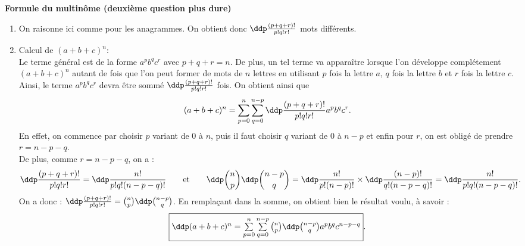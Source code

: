 \documentclass[a4paper, 11pt]{article}
\begin{document}
\begin{correction}  \; \textbf{Formule du multin\^ome (deuxi\`eme question plus dure)}
	\begin{enumerate}
		\item On raisonne ici comme pour les anagrammes. On obtient donc $\ddp\frac{(p+q+r)!}{p!q!r!}$ mots diff\'erents.
		\item Calcul de $(a+b+c)^n$:\\
		      \noindent Le terme g\'en\'eral est de la forme $a^{p} b^{q} c^{r}$ avec $p+q+r=n$. De plus, un tel terme va appara\^itre lorsque l'on d\'eveloppe compl\'etement $(a+b+c)^n$ autant de fois que l'on peut former de mots de $n$ lettres en utilisant $p$ fois la lettre $a$, $q$ fois la lettre $b$ et $r$ fois la lettre $c$. Ainsi, le terme $a^{p} b^{q} c^{r}$ devra \^etre somm\'e $\ddp\frac{(p+q+r)!}{p!q!r!}$ fois. On obtient ainsi que
		      $$(a+b+c)^n =\sum\limits_{p=0}^n \sum\limits_{q=0}^{n-p} \ddp\frac{(p+q+r)!}{p!q!r!} a^p b^q c^r.$$
		      En effet, on commence par choisir $p$ variant de $0$ \`a $n$, puis il faut choisir $q$ variant de $0$ \`a $n-p$ et enfin pour $r$, on est oblig\'e de prendre $r=n-p-q$.\\
		      De plus, comme $r=n-p-q$, on a :
		      $$\ddp\frac{(p+q+r)!}{p!q!r!}= \ddp\frac{n!}{p!q!(n-p-q)!}\qquad \hbox{et}\qquad \ddp \binom{n}{p}\ddp \binom{n-p}{q}=\ddp\frac{n!}{p!(n-p)!}\times\ddp\frac{(n-p)!}{q!(n-p-q)!} = \ddp\frac{n!}{p!q!(n-p-q)!}.$$
		      On a donc : $\ddp\frac{(p+q+r)!}{p!q!r!}= \binom{n}{p}\ddp \binom{n-p}{q}$. En rempla\c cant dans la somme, on obtient bien le r\'esultat voulu, \`a savoir :
		      $$\fbox{$\ddp  (a+b+c)^n =\sum\limits_{p=0}^n \sum\limits_{q=0}^{n-p} \binom{n}{p}\ddp \binom{n-p}{q} a^pb^q c^{n-p-q}$}.$$
	\end{enumerate}
\end{correction}
\end{document}
